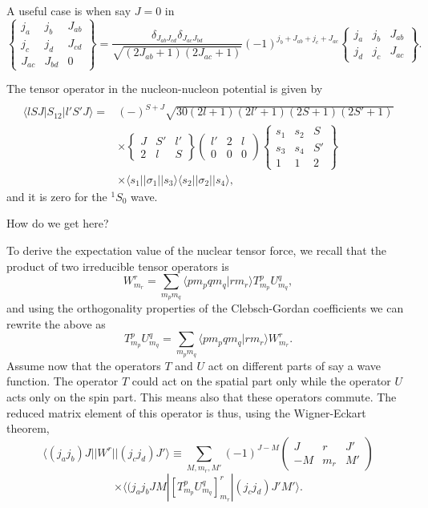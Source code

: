 \documentclass[graybox,sectrefs,envcountresetchap,open=right]{svmonodo}
\begin{document}
A useful case is when say $J=0$ in 
\[
\left\{\begin{array}{ccc} j_a & j_b& J_{ab} \\ j_c & j_d & J_{cd} \\ J_{ac} & J_{bd}& 0\end{array}\right\}=\frac{\delta_{J_{ab}J_{cd}} \delta_{J_{ac}J_{bd}}}{\sqrt{(2J_{ab}+1)(2J_{ac}+1)}} (-1)^{j_b+J_{ab}+j_c+J_{ac}} \begin{Bmatrix} j_a & j_b & J_{ab}\\ j_d & j_c & J_{ac} \end{Bmatrix}. 
\]


The tensor operator in the nucleon-nucleon potential
is given by
\[
\begin{array}{ll}
&\\
\langle lSJ\vert S_{12}\vert l'S'J\rangle =&
(-)^{S+J}\sqrt{30(2l+1)(2l'+1)(2S+1)(2S'+1)}\\
&\times\left\{\begin{array}{ccc}J&S'&l'\\2&l&S\end{array}\right\}
\left(\begin{array}{ccc}l'&2&l\\0&0&0\end{array}\right)
\left\{\begin{array}{ccc}s_{1}&s_{2}&S\\s_{3}&s_{4}&S'\\
1&1&2\end{array}
\right\}\\
&\times\langle s_{1}\vert\vert \sigma_{1}\vert\vert s_{3}\rangle
\langle s_{2}\vert\vert \sigma_{2}\vert \vert s_{4}\rangle,
\end{array}
\]
and it is zero for the $^1S_0$ wave. 

How do we get here?


To derive the expectation value of the nuclear tensor force, we recall that 
the product of two irreducible tensor operators is
\[
W^{r}_{m_r}=\sum_{m_pm_q}\langle pm_pqm_q|rm_r\rangle T^{p}_{m_p}U^{q}_{m_q},
\] 
and using the orthogonality properties of the Clebsch-Gordan coefficients we can rewrite the above as
\[
T^{p}_{m_p}U^{q}_{m_q}=\sum_{m_pm_q}\langle pm_pqm_q|rm_r\rangle W^{r}_{m_r}.
\] 
Assume now that the operators $T$ and $U$ act on different parts of say a wave function. The operator $T$ could act on the spatial part only while the operator $U$ acts only on the spin part. This means also that these operators commute.
The reduced matrix element of this operator is thus, using the Wigner-Eckart theorem,
\[
\langle (j_aj_b)J||W^{r}||(j_cj_d)J'\rangle\equiv\sum_{M,m_r,M'}(-1)^{J-M}\left(\begin{array}{ccc}  J & r & J' \\ -M & m_r & M'\end{array}\right)
\]
\[
\times\langle (j_aj_bJM|\left[ T^{p}_{m_p}U^{q}_{m_q} \right]^{r}_{m_r}|(j_cj_d)J'M'\rangle.
\]
\end{document}
